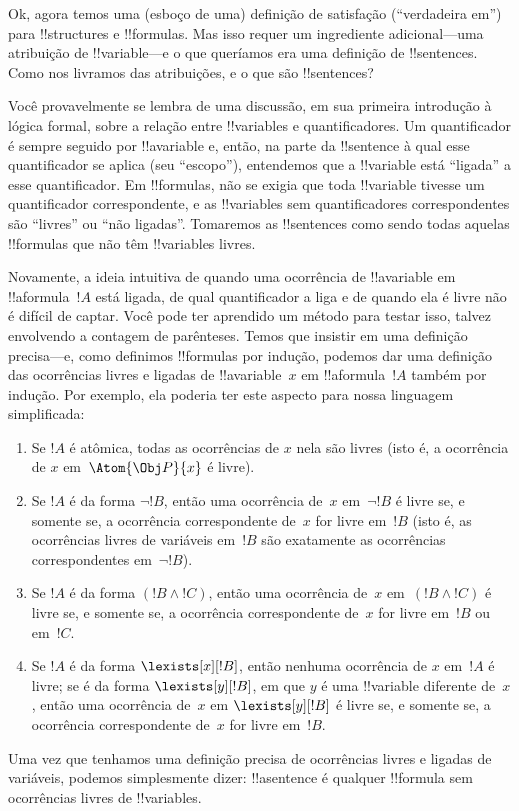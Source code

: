 \documentclass[../../../include/open-logic-section]{subfiles}
\begin{document}


Ok, agora temos uma (esboço de uma) definição de satisfação
(``verdadeira em'') para !!{structure}s e !!{formula}s. Mas isso requer
um ingrediente adicional---uma atribuição de !!{variable}---e o que
queríamos era uma definição de !!{sentence}s. Como nos livramos das
atribuições, e o que são !!{sentence}s?

Você provavelmente se lembra de uma discussão, em sua primeira
introdução à lógica formal, sobre a relação entre !!{variable}s e
quantificadores. Um quantificador é sempre seguido por !!a{variable} e,
então, na parte da !!{sentence} à qual esse quantificador se aplica (seu
``escopo''), entendemos que a !!{variable} está ``ligada'' a esse
quantificador. Em !!{formula}s, não se exigia que toda !!{variable}
tivesse um quantificador correspondente, e as !!{variable}s sem
quantificadores correspondentes são ``livres'' ou ``não ligadas''.
Tomaremos as !!{sentence}s como sendo todas aquelas !!{formula}s que não
têm !!{variable}s livres.

Novamente, a ideia intuitiva de quando uma ocorrência de !!a{variable}
em !!a{formula}~$!A$ está ligada, de qual quantificador a liga e de
quando ela é livre não é difícil de captar. Você pode ter aprendido um
método para testar isso, talvez envolvendo a contagem de parênteses.
Temos que insistir em uma definição precisa---e, como definimos
!!{formula}s por indução, podemos dar uma definição das ocorrências
livres e ligadas de !!a{variable}~$x$ em !!a{formula}~$!A$ também por
indução.  Por exemplo, ela poderia ter este aspecto para nossa
linguagem simplificada:
\begin{enumerate}
  \item Se $!A$ é atômica, todas as ocorrências de $x$ nela são livres
  (isto é, a ocorrência de $x$ em~$\Atom{\Obj P}{x}$ é livre).
  \item Se $!A$ é da forma $\lnot !B$, então uma ocorrência de~$x$
  em~$\lnot !B$ é livre se, e somente se, a ocorrência correspondente
  de~$x$ for livre em~$!B$ (isto é, as ocorrências livres de variáveis
  em~$!B$ são exatamente as ocorrências correspondentes em~$\lnot !B$).
  \item Se $!A$ é da forma $(!B \land !C)$, então uma ocorrência de~$x$
  em~$(!B \land !C)$ é livre se, e somente se, a ocorrência
  correspondente de~$x$ for livre em~$!B$ ou em~$!C$.
  \item Se $!A$ é da forma $\lexists[x][!B]$, então nenhuma ocorrência
  de $x$ em~$!A$ é livre; se é da forma $\lexists[y][!B]$, em que
  $y$ é uma !!{variable} diferente de~$x$, então uma ocorrência de~$x$
  em $\lexists[y][!B]$ é livre se, e somente se, a ocorrência
  correspondente de~$x$ for livre em~$!B$.
\end{enumerate}

Uma vez que tenhamos uma definição precisa de ocorrências livres e
ligadas de variáveis, podemos simplesmente dizer: !!a{sentence} é
qualquer !!{formula} sem ocorrências livres de !!{variable}s.
\end{document}
